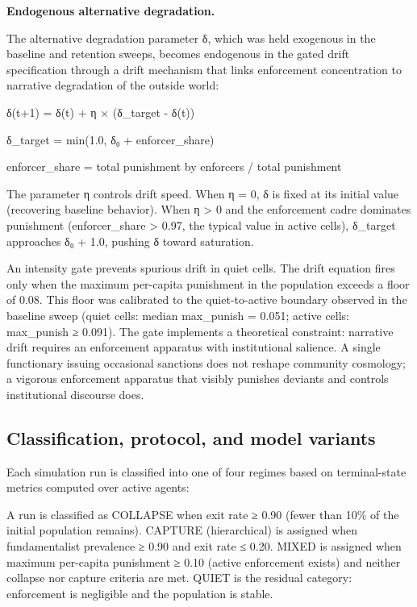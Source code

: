 \documentclass[12pt]{article}
\begin{document}
%

\textbf{Endogenous alternative degradation.}

The alternative degradation parameter δ, which was held exogenous in the baseline and retention sweeps, becomes endogenous in the gated drift specification through a drift mechanism that links enforcement concentration to narrative degradation of the outside world:

δ(t+1) = δ(t) + η × (δ\_target - δ(t))

δ\_target = min(1.0, δ₀ + enforcer\_share)

enforcer\_share = total punishment by enforcers / total punishment

The parameter η controls drift speed. When η = 0, δ is fixed at its initial value (recovering baseline behavior). When η > 0 and the enforcement cadre dominates punishment (enforcer\_share > 0.97, the typical value in active cells), δ\_target approaches δ₀ + 1.0, pushing δ toward saturation.

An intensity gate prevents spurious drift in quiet cells. The drift equation fires only when the maximum per-capita punishment in the population exceeds a floor of 0.08. This floor was calibrated to the quiet-to-active boundary observed in the baseline sweep (quiet cells: median max\_punish = 0.051; active cells: max\_punish ≥ 0.091). The gate implements a theoretical constraint: narrative drift requires an enforcement apparatus with institutional salience. A single functionary issuing occasional sanctions does not reshape community cosmology; a vigorous enforcement apparatus that visibly punishes deviants and controls institutional discourse does.

%
\subsection{Classification, protocol, and model variants}

Each simulation run is classified into one of four regimes based on terminal-state metrics computed over active agents:

A run is classified as COLLAPSE when exit rate ≥ 0.90 (fewer than 10\% of the initial population remains). CAPTURE (hierarchical) is assigned when fundamentalist prevalence ≥ 0.90 and exit rate ≤ 0.20. MIXED is assigned when maximum per-capita punishment ≥ 0.10 (active enforcement exists) and neither collapse nor capture criteria are met. QUIET is the residual category: enforcement is negligible and the population is stable.
\end{document}
